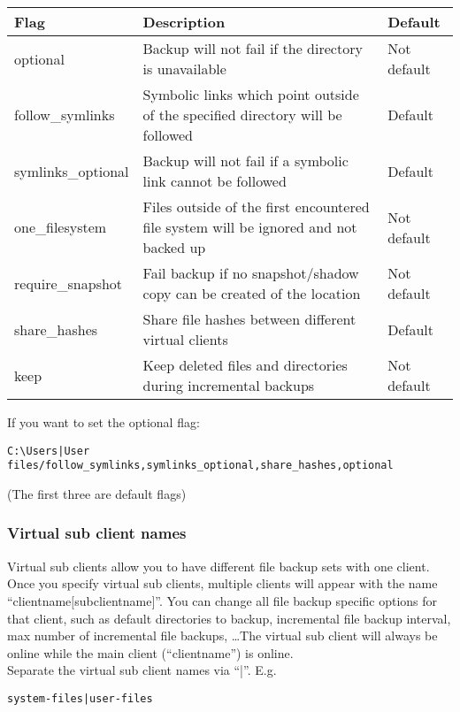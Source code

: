 \documentclass[a4paper,10pt]{article}
\begin{document}
\begin{tabular}{|p{}|p{}|p{}|}
\hline
Flag & Description & Default\\
\hline\hline
optional & Backup will not fail if the directory is unavailable & Not default\\
\hline
follow\_symlinks & Symbolic links which point outside of the specified directory will be followed & Default\\
\hline
symlinks\_optional & Backup will not fail if a symbolic link cannot be followed & Default\\
\hline
one\_filesystem & Files outside of the first encountered file system will be ignored and not backed up & Not default \\
\hline
require\_snapshot & Fail backup if no snapshot/shadow copy can be created of the location & Not default\\
\hline
share\_hashes & Share file hashes between different virtual clients & Default\\
\hline
keep & Keep deleted files and directories during incremental backups & Not default\\
\hline
\end{tabular}
\par\null\par
\noindent If you want to set the optional flag:
\begin{verbatim}
C:\Users|User files/follow_symlinks,symlinks_optional,share_hashes,optional
\end{verbatim}
(The first three are default flags)

\subsubsection{Virtual sub client names}

Virtual sub clients allow you to have different file backup sets with one client. Once you specify virtual sub clients,
multiple clients will appear with the name ``clientname$[$subclientname$]$''. You can change all file backup specific options for that client, such as default directories to backup, incremental file backup interval, max number of incremental file backups, \ldots The virtual sub client will always be online while the main client (``clientname'') is online.\\

\noindent Separate the virtual sub client names via ``|''. E.g.
\begin{verbatim}
system-files|user-files
\end{verbatim}
\end{document}
